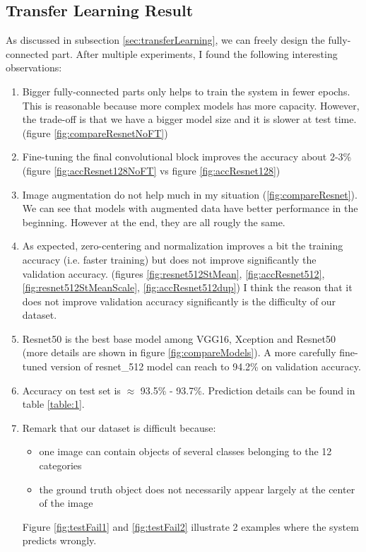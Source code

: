 \subsection{Transfer Learning Result}
As discussed in subsection \ref{sec:transferLearning}, we can freely design the fully-connected part. After multiple experiments, I found the following interesting observations:
\begin{enumerate}
	\item Bigger fully-connected parts only helps to train the system in fewer epochs. This is reasonable because more complex models has more capacity. However, the trade-off is that we have a bigger model size and it is slower at test time. (figure \ref{fig:compareResnetNoFT})
	\item Fine-tuning the final convolutional block improves the accuracy about 2-3\% (figure \ref{fig:accResnet128NoFT} vs figure \ref{fig:accResnet128})
	\item Image augmentation do not help much in my situation (\ref{fig:compareResnet}). We can see that models with augmented data have better performance in the beginning. However at the end, they are all rougly the same.
	\item As expected, zero-centering and normalization improves a bit the training accuracy (i.e. faster training) but does not improve significantly the validation accuracy. (figures \ref{fig:resnet512StMean}, \ref{fig:accResnet512}, \ref{fig:resnet512StMeanScale}, \ref{fig:accResnet512dup}) I think the reason that it does not improve validation accuracy significantly is the difficulty of our dataset.
	\item Resnet50 is the best base model among VGG16, Xception and Resnet50 (more details are shown in figure \ref{fig:compareModels}). A more carefully fine-tuned version of resnet\_512 model can reach to 94.2\% on validation accuracy.
	\item Accuracy on test set is $\approx$ 93.5\% - 93.7\%. Prediction details can be found in table \ref{table:1}. 
	\item Remark that our dataset is difficult because:
	\begin{itemize}
		\item one image can contain objects of several classes belonging to the 12 categories
		\item the ground truth object does not necessarily appear largely at the center of the image
	\end{itemize}
	Figure \ref{fig:testFail1} and \ref{fig:testFail2} illustrate 2 examples where the system predicts wrongly.
\end{enumerate}
	

